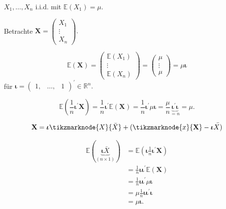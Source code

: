 \documentclass{tstextbook}
\begin{document}
\begin{example}
	
$X_{1},\ldots,X_{n}$ i.i.d. mit $\mathbb{E}\left(X_{1}\right)=\mu.$

Betrachte $\textbf{X}=\begin{pmatrix}
	X_{1}\\
	\vdots\\
	X_{n}
\end{pmatrix}.$

\[
\mathbb{E}(\textbf{X})=\begin{pmatrix}\mathbb{E}(X_{1})\\
	\vdots\\
	\mathbb{E}(X_{n})
\end{pmatrix}= \begin{pmatrix}
	\mu \\ \vdots \\ \mu
\end{pmatrix} = \mu\boldsymbol{\iota}
\]
für $\boldsymbol{\iota}=\begin{pmatrix}1, & \ldots, & 1\end{pmatrix}^{\prime}\in\mathbb{R}^{n}.$

\[
\mathbb{E}\left(\frac{1}{n}\boldsymbol{\iota}^{\prime}\textbf{X}\right)=\frac{1}{n}\boldsymbol{\iota}^{\prime}\mathbb{E}(\textbf{X})=\frac{1}{n}\boldsymbol{\iota}^{\prime}\mu\boldsymbol{\iota}=\frac{\mu}{n}\underset{=n}{\underbrace{\boldsymbol{\iota}^{\prime}\boldsymbol{\iota}}}=\mu.
\]

\end{example}

\begin{remark}
\[  
\textbf{X} =\boldsymbol{\iota}\tikzmarknode{X}{\bar{X}}+(\tikzmarknode{x}{\textbf{X}}-\boldsymbol{\iota}\bar{X)}
\]
\vspace{6ex}
\end{remark}

\begin{example}

\[
\begin{aligned}
\mathbb{E}(\underset{(n\times1)}{\underbrace{\boldsymbol{\iota}\bar{X}}}) & =\mathbb{E}\left(\boldsymbol{\iota}\frac{1}{n}\boldsymbol{\iota}^{\prime}\textbf{X}\right)\\
 & =\frac{1}{n}\boldsymbol{\iota}\boldsymbol{\iota}^{\prime}\mathbb{E}(\textbf{X})\\
 & =\frac{1}{n}\boldsymbol{\iota}\boldsymbol{\iota}^{\prime}\mu\boldsymbol{\iota}\\
 & =\mu\frac{1}{n}\boldsymbol{\iota}\boldsymbol{\iota}^{\prime}\boldsymbol{\iota}\\
 & =\mu\boldsymbol{\iota}.
\end{aligned}
\]

\end{example}
\end{document}

